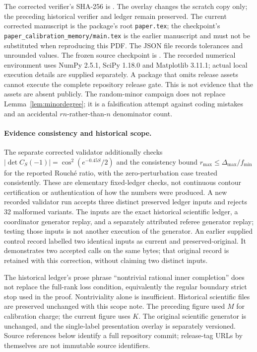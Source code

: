 \documentclass[11pt]{article}
\theoremstyle{definition}
\theoremstyle{remark}
\begin{document}
The corrected verifier's SHA-256 is
.
The overlay changes the scratch copy only; the preceding historical verifier
and ledger remain preserved. The current corrected manuscript is the package's
root \texttt{paper.tex}; the checkpoint's \texttt{paper\_calibration\_memory/main.tex}
is the earlier manuscript and must not be substituted when reproducing this PDF.
  The JSON file records tolerances and unrounded values. The frozen source
checkpoint is .
The recorded numerical environment uses NumPy 2.5.1, SciPy 1.18.0 and
Matplotlib 3.11.1; actual local execution details are supplied separately.
A package that omits release assets cannot execute the complete repository
release gate. This is not evidence that the assets are absent publicly.
The random-minor campaign does not replace Lemma~\ref{lem:minordegree}; it is
a falsification attempt against coding mistakes and an accidental
$rn$-rather-than-$n$ denominator count.

\paragraph{Evidence consistency and historical scope.}
The separate corrected validator additionally checks
$|\det C_S(-1)|=\cos^2(e^{-0.45S}/2)$ and the consistency bound
$r_{\max}\leq\Delta_{\max}/f_{\min}$ for the reported Rouch\'e ratio,
with the zero-perturbation case treated consistently. These are elementary
fixed-ledger checks, not continuous contour certification or authentication
of how the numbers were produced. A new recorded validator run accepts three
distinct preserved ledger inputs and rejects 32 malformed variants. The
inputs are the exact historical scientific ledger, a coordinator generator
replay, and a separately attributed referee generator replay; testing those
inputs is not another execution of the generator. An earlier supplied
control record labelled two identical inputs as current and preserved-original.
It demonstrates two accepted calls on the same bytes; that original record
is retained with this correction, without claiming two distinct inputs.

The historical ledger's prose phrase ``nontrivial rational inner completion''
does not replace the full-rank loss condition, equivalently the regular
boundary strict stop used in the proof. Nontriviality alone is insufficient.
Historical scientific files are preserved unchanged with this scope note.
The preceding figure used $M$ for calibration charge; the current figure
uses $K$. The original scientific generator is unchanged, and the single-label
presentation overlay is separately versioned. Source references below identify a full repository commit;
release-tag URLs by themselves are not immutable source identifiers.
\end{document}
